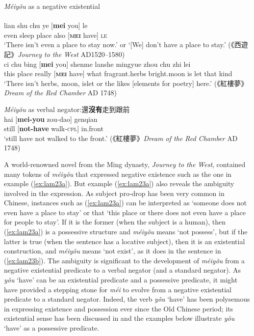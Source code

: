 \documentclass[output=paper]{langscibook}
\begin{document}
\ea \textit{Méiyǒu} as a negative existential \label{ex:lam23}\\
   \label{ex:lam23a}\\
  	\gll lian shu chu ye [\textbf{mei} you] le\\ 
  	even sleep place also [\textbf{\textsc{mei}} have] \textsc{le}\\
  	\glt `There isn't even a place to stay now.' or `[We] don't have a place to stay.' ({\cn 《西遊記》}\emph{Journey to the West} AD1520–1580)
  \label{ex:lam23b}\\
  	\gll ci chu bing [\textbf{mei} you] shenme lanshe mingyue zhou chu zhi lei\\
  	this	 place really [\textbf{\textsc{mei}} have] what fragrant.herbs bright.moon is let that kind\\ 
  	\glt `There isn't herbs, moon, islet or the likes [elements for poetry] here.' ({\cn 《紅樓夢》}\emph{Dream of the Red Chamber} AD 1748)
\z \z


\ea \textit{Méiyǒu} as verbal negator:{\cn  還\textbf{沒有}走到跟前} \label{ex:lam24}\\
  \gll hai [\textbf{mei-you} zou-dao] genqian\\
  still [\textbf{not-have} walk-\textsc{cpl}] in.front\\
  \glt `still have not walked to the front.' ({\cn 《紅樓夢》}\emph{Dream of the Red Chamber} AD 1748)
\z


A world-renowned novel from the Ming dynasty, \emph{Journey to the West}, contained many tokens of \textit{méiyǒu} that expressed negative existence such as the one in example (\ref{ex:lam23a}). But example (\ref{ex:lam23a}) also reveals the ambiguity involved in the expression. As subject pro-drop has been very common in Chinese, instances such as (\ref{ex:lam23a}) can be interpreted as `someone does not even have a place to stay' or that `this place or there does not even have a place for people to stay'. If it is the former (when the subject is a human), then (\ref{ex:lam23a}) is a possessive structure and \textit{méiyǒu} means `not possess', but if the latter is true (when the sentence has a locative subject), then it is an existential construction, and \textit{méiyǒu} means `not exist', as it does in the sentence in (\ref{ex:lam23b}). The ambiguity is significant to the development of \textit{méiyǒu} from a negative existential predicate to a verbal negator (and a standard negator). As \textit{yǒu} `have' can be an existential predicate and a possessive predicate, it might have provided a stepping stone for \textit{méi} to evolve from a negative existential predicate to a standard negator. Indeed, the verb \textit{yǒu} `have' has been polysemous in expressing existence and possession ever since the Old Chinese period; its existential sense has been discussed in  and the examples below illustrate \textit{yǒu} `have' as a possessive predicate.
\end{document}

